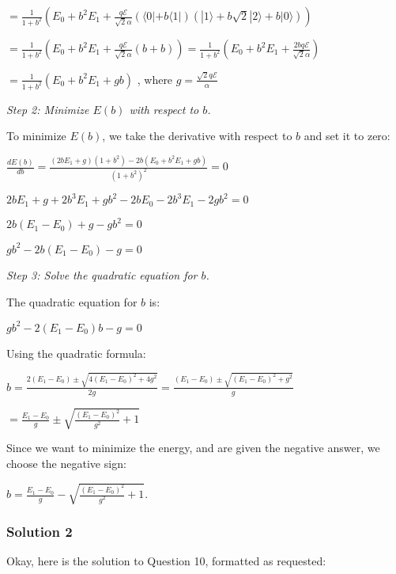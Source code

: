 \documentclass{article}
\begin{document}
\noindent $= \frac{1}{1+b^2} (E_0 + b^2 E_1 + \frac{q\mathcal{E}}{\sqrt{2}\alpha} (\langle 0| + b\langle 1|) (|1\rangle + b\sqrt{2}|2\rangle + b|0\rangle))$

\noindent $= \frac{1}{1+b^2} (E_0 + b^2 E_1 + \frac{q\mathcal{E}}{\sqrt{2}\alpha} (b + b)) = \frac{1}{1+b^2} (E_0 + b^2 E_1 + \frac{2bq\mathcal{E}}{\sqrt{2}\alpha})$

\noindent $ = \frac{1}{1+b^2} (E_0 + b^2 E_1 + gb)$ , where \(g = \frac{\sqrt{2}q\mathcal{E}}{\alpha}\)

\noindent\textit{Step 2: Minimize $E(b)$ with respect to $b$.}

\noindent To minimize $E(b)$, we take the derivative with respect to $b$ and set it to zero:

\noindent $\frac{dE(b)}{db} = \frac{(2bE_1 + g)(1+b^2) - 2b(E_0 + b^2 E_1 + gb)}{(1+b^2)^2} = 0$

\noindent $2bE_1 + g + 2b^3 E_1 + gb^2 - 2bE_0 - 2b^3 E_1 - 2gb^2 = 0$

\noindent $2b(E_1 - E_0) + g - gb^2 = 0$

\noindent $gb^2 - 2b(E_1 - E_0) - g = 0$

\noindent\textit{Step 3: Solve the quadratic equation for $b$.}

\noindent The quadratic equation for $b$ is:

\noindent $gb^2 - 2(E_1 - E_0)b - g = 0$

\noindent Using the quadratic formula:

\noindent $b = \frac{2(E_1 - E_0) \pm \sqrt{4(E_1 - E_0)^2 + 4g^2}}{2g} = \frac{(E_1 - E_0) \pm \sqrt{(E_1 - E_0)^2 + g^2}}{g}$

\noindent $ = \frac{E_1 - E_0}{g} \pm \sqrt{\frac{(E_1 - E_0)^2}{g^2} + 1}$

\noindent Since we want to minimize the energy, and are given the negative answer, we choose the negative sign:

\noindent $b = \frac{E_1 - E_0}{g} - \sqrt{\frac{(E_1 - E_0)^2}{g^2} + 1}$.


\subsubsection{Solution 2}
Okay, here is the solution to Question 10, formatted as requested:
\end{document}
